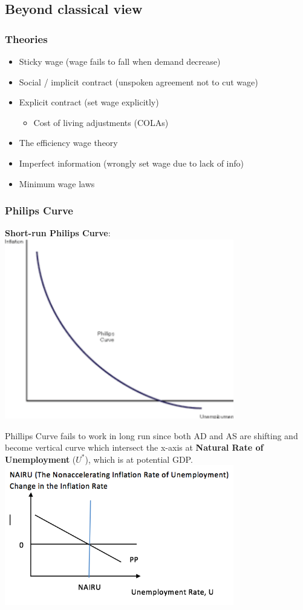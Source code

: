 \documentclass[11pt]{article}
\begin{document}
\subsection{Beyond classical view}
    \subsubsection{Theories}
    \begin{itemize}
        \item Sticky wage (wage fails to fall when demand decrease)
        \item Social / implicit contract (unspoken agreement not to cut wage)
        \item Explicit contract (set wage explicitly)
        \begin{itemize}
            \item Cost of living adjustments (COLAs)
        \end{itemize}
        \item The efficiency wage theory
        \item Imperfect information (wrongly set wage due to lack of info)
        \item Minimum wage laws
    \end{itemize}
    \subsubsection{Philips Curve}
\textbf{Short-run Philips Curve}:\\

\includegraphics[width=10cm]{philips.png}

Phillips Curve fails to work in long run since both AD and AS are shifting and become vertical curve which intersect the x-axis at \textbf{Natural Rate of Unemployment} ($U^*$), which is at potential GDP.\\
\includegraphics[width=10cm]{NAIRU.png}
\end{document}
